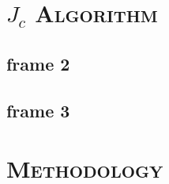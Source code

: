 \documentclass[xcolor=x11names,compress]{beamer}
\renewcommand{\(}{\begin{columns}}
\renewcommand{\)}{\end{columns}}
\newcommand{\<}[1]{\begin{column}{#1}}
\renewcommand{\>}{\end{column}}
\begin{document}
\section{\scshape $J_c$ Algorithm}


\subsection{frame 2}
\begin{frame}

\end{frame}

\subsection{frame 3}
\begin{frame}

\end{frame}


\section{\scshape Methodology}
\end{document}
